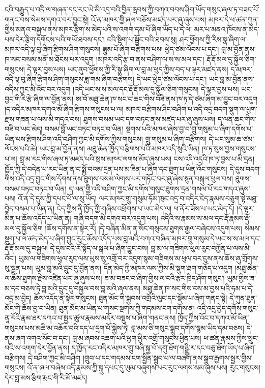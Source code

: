 \documentclass{article}
\begin{document}
ངའི་བརྒྱུད་པ་འདི་ལ་གཞན་དང་རང་ཡེ་མི་འདྲ་བའི་བྱིན་རླབས་ཀྱི་བཀའ་བབས་ཤིག་ཡོད་གསུང་ཞལ་ཏ་བཟང་པོ་གནང་བས་སེམས་དགའ་བར་བྱུང་སྟེ། འོ་ན་མཁར་གྱི་ཞལ་བཅོས་མཛད་པར་ཞུ་ཞུས་པས། མཁར་དེ་ཕ་ཚན་ཀུན་གྱིས་མནའ་བསྐྱལ་ནས་མཁར་རྩིག་ས་མེད་པའི་ས་འགག་དམ་པོ་ཞིག་ཡོད་པ་དེ་ལ། མར་པ་མནའ་ཁོངས་ན་མེད་པས་དེར་རྩིག་དགོངས་པའི་གཡོ་ཐབས་དང་། ངའི་སྡིག་པ་སྦྱོང་བའི་ཐབས་སུ། ཤར་ཕྱོགས་ཀྱི་རིས་སྣ་ཞིག་ལ་མཁར་འདི་ལྟ་བུ་ཞིག་རྩིགས་ཤིག་གསུངས། ཟླུམ་པོ་ཞིག་བརྩིགས་པས། ཕྱེད་ཙམ་ལོངས་པ་དང་། བླ་མ་བྱོན་ནས་ཁ་སང་བསམ་མནོ་མ་ཐོངས་པར་འདུག །མཁར་འདི་རྩ་བ་ནས་བཤིག་ལ་ས་ས་མལ་དང་། རྡོ་རྡོ་མལ་དུ་སྐྱོལ་ཅིག་གསུངས། དེ་ལྟར་བྱས་པས། ཡང་ནུབ་ཕྱོགས་ཀྱི་རི་སྣ་ཞིག་ལ་བླ་མ་ཕུད་ཀྱིས་བད་པ་ལྟར་མཛད་ནས། ད་མཁར་འདི་ལྟ་བུ་ཞིག་རྩིགས་ཤིག་གསུངས་ཟླ་གམ་ཞིག་བརྩིགས། དེ་ཡང་ཕྱེད་ཙམ་ལོངས་པ་དང་། ཡང་བླ་མ་བྱོན་ནས་འདིས་ཀྱང་མི་འོང་བར་འདུག །འདི་ཡང་ས་ས་མལ་དང་རྡོ་རྡོ་མལ་དུ་སྐྱོལ་ཅིག་གསུངས། དེ་ལྟར་བྱས་པས། ཡང་བྱང་གི་རི་རྩེ་ཞིག་ལ་བྱོན་ནས། ཨ་བོ་མཐུ་ཆེན་ཁ་སང་ང་ཆང་གིས་བཟི་ནས་ཁ་ཏ་དེ་ཙམ་ཞིག་མ་བྱུང་བར་འདུག །ད་འདིར་མཁར་དགའ་མོ་ཞིག་རྩིགས་གསུངས་པ་ལ། མཁར་བརྩིགས་ཤིང་བཤིག་པ་འདི་འདྲ་བདག་སྡུག་ལ་ཕྱག་རྫས་གཟན་པ་ལས་མི་གདའ་བས། ཐུགས་བསམ་ཡང་དག་བཏང་ནས་མཛད་པར་ཞུ་ཞུས་པས། ད་ལན་ཆང་གིས་བཟི་བ་ཡང་མེད། བསམ་བློ་ཡང་བཏང་བཏང་བ་ཡིན། སྔགས་པའི་མཁར་ཞེས་བྱ་བ་གྲུ་གསུམ་པ་ཞིག་དགོས་པ་ཡིན་པས་རྩིགས་ཤིག་འདི་བཤིག་ཀྱང་མི་དགོས་ཀྱིས་གསུངས། གྲུ་གསུམ་པ་ཞིག་བརྩིགས། དེ་ཡང་སུམ་ཆ་ཙམ་ལོངས་པའི་ཚེ། ཡང་བླ་མ་བྱོན་ནས། མཐུ་ཆེན་ཁྱོད་བརྩིགས་པའི་མཁར་འདི་སུའི་ཡིན། ཁ་ཏ་སུས་བྱས་གསུངས་པ་ལ། བླ་མ་རང་གིས་ཞལ་ཏ་མཛད་པའི་སྲས་མཁར་ལགས་མོད་ཞུས་པས། ངས་འདི་འདྲའི་ཁ་ཏ་བྱས་པ་མི་དྲན། ཁྱོད་ཀྱི་དེ་བདེན་པ་རང་ཡིན་ན་ང་སྨྱོ་བའམ་དྲན་པས་མ་ཟིན་པ་ཞིག་དང་ཐུག་པ་ཡིན་འོང་གསུངས། དེ་དུས་བདག་གིས་འདི་འདྲ་བྱུང་གིས་དོགས་ནས་ཐུགས་བསམ་ལེགས་པར་གཏོང་བར་ཞུ་ཞེས་སྙན་བསྐུལ་ཕུལ་བས། ཐུགས་བསམ་བཏང་བཏང་བ་ཡིན། ད་ལན་གྱི་འདི་བཤིག་ཀྱང་མི་དགོས་གསུང་ཐུགས་དྲན་གསལ་པོ་རང་གདའ་ཞུས་པས། འོ་ན་དེ་དུས་ཀྱི་དཔང་པོ་ལ་སུ་ཡོད། ལར་མཁར་གྲུ་གསུམ་ཧོམ་ཁུང་འདྲ་བ་འདིར་ངེད་རྣམས་བཅུག་སྟེ་མཐུ་བྱེད་བསམ་པ་ཡིན་ན། ངེད་ཀྱིས་ནི་ཁྱོད་ཀྱི་གཞིས་འཕྲོགས་པ་ཡང་མེད་ལ། ཕ་ནོར་ཟོས་པ་ཡང་མེད་དོ། །དེ་ལྟར་མིན་པ་ཆོས་འདོད་པ་ཡིན་ན། གཞི་བདག་མི་དགའ་བར་འདུག་པས། འདིའི་ས་རྣམས་ས་མལ་དང་རྡོ་རྣམས་རྡོ་མལ་དུ་སྐྱོལ་ཅིག །ཆོས་དགོས་ན་སྟེར་རོ། །དེ་བཞིན་མིན་ན་སོང་གསུངས་ཐུགས་རྒྱལ་བཞེངས་འདུག་པས། སེམས་སྡུག་པ་ལ་ཚད་མེད་པ་ཞིག་བྱུང་རུང་ཆོས་འདོད་པས་བླ་མའི་བཀའ་བཞིན་མཁར་གྲུ་གསུམ་དེ་ཡང་ས་ས་མལ་དང་རྡོ་རྡོ་མལ་དུ་བསྐྱལ། དེ་དུས་ངའི་རོ་སྟོད་ལ་སྒལ་པ་ཞིག་བྱུང་བས། བླ་མ་ལ་གཟིགས་ཕུལ་རུང་བཀྱོན་པ་ལས་མི་འོང་། ཡུམ་ལ་གཟིགས་ཕུལ་རུང་ལས་ཡུས་སུ་འགྲོ་བར་འདུག་སྙམ་གཟིགས་མ་ཕུལ་བར་ངུས་ནས་ཆོས་ཞུ་གྲོགས་སུ་སྦྲན་པས། ཡུམ་བླ་མའི་དྲུང་དུ་བྱོན་ནས། དོན་མེད་ཀྱི་མཁར་ལས་ཀྱིས་མི་སྡུག་ཐག་གཅོད་པ་འདུག །མཐུ་ཆེན་ལ་ཆོས་ཐུགས་རྗེས་འཛིན་པར་ཞུ་ཞུས་པས། ཟ་མ་བཟང་བ་ཞིག་གྱིས་ལ་ངའི་རྩར་ཁྲིད་ཤོག་གསུང་། ཡུམ་གྱིས་ཟ་མ་དང་བཅས་ཏེ་བླ་མའི་དྲུང་དུ་བསྐྱལ་བས་བླ་མའི་ཞལ་ནས། མཐུ་ཆེན་ཁ་སང་གིས་ངས་མ་བྱས་པའི་ཧམ་པ་དེ་འདྲ་མ་བྱེད། ཆོས་འདོད་ན་སྟེར་གསུངས། ཐུན་མོང་གི་སྐྱབས་འགྲོའི་ལུང་དང་སྡོམ་པ་ཞིག་གནང་སྟེ། དེ་ཀུན་ཐུན་མོང་གི་ཆོས་བྱ་བ་ཡིན། ཐུན་མོང་མ་ཡིན་པ་གསང་སྔགས་ཀྱི་གདམས་ངག་དགོས་ན། འདི་འདྲ་བྱེད་དགོས་གསུང་ནཱ་རོའི་རྣམ་ཐར་དཀའ་བ་སྤྱད་ཚུལ་རྣམས་མདོར་བསྡུས་པ་ཞིག་གནང་ནས། ཁྱོད་ཀྱིས་འོང་བ་དཀའ་མོ་ཡིན་གསུངས་པས་མཆི་མ་འཆོར་བའི་དད་པ་དྲག་པོ་སྐྱེས་ཏེ། བླ་མས་ཅི་གསུང་སྒྲུབ་དགོས་སྙམ་ཡིད་དམ་བཅས། དེ་ནས་ཞག་འགའ་སོང་བ་དང་། བླ་མ་ཞབས་འཆག་པའི་ཕྱག་ཕྱིར་འགྲོ་གསུངས་ཕྱིན་པས། ཕ་ཚན་རྣམས་ཀྱིས་སྲུང་བའི་ས་འགག་དེར་བྱོན་ནས། ད་ཁྱོད་རང་འདིར་མཁར་གྲུ་བཞི་སྐྱ་བོ་དགུ་ཐོག་གཉྫྱི་ར་དང་བཅུ་ཐོག་ཡོད་པ་ཞིག་བརྩིགས། དེ་བཤིག་ཀྱང་མི་བཤིག །གྲུབ་པ་དང་གདམས་ངག་སྦྱིན་སྒྲུབ་པ་ལ་བཞག་ནས་སྒྲུབ་རྒྱགས་སྦྱར་གྱིས་གསུངས། འོ་ན་ཞལ་བཞེས་འདི་རྣམས་ཀྱི་སྐུ་དཔང་དུ་ཡུམ་བཞུགས་པར་རུང་ལགས་སམ་ཞུས་པས། རུང་གསུངས། དེར་བླ་མས་རྩིག་རྨང་གི་རི་མོ་མཛད། 
\end{document}
